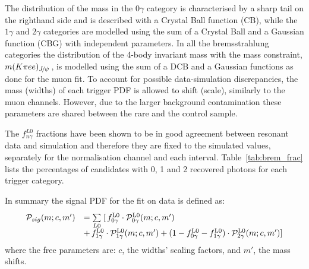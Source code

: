 The distribution of the \mKpiee mass in the $0\gamma$ category is characterised by a sharp tail on the righthand side and is described 
with a Crystal Ball function (CB), while the $1\gamma$ and $2\gamma$ categories are modelled using the sum of a Crystal Ball 
and a Gaussian function (CBG) with independent parameters. In all the bremsstrahlung categories the distribution of the 4-body 
invariant mass with the \jpsi mass constraint, $m(K\pi ee)_{\jpsi}$, is modelled using the sum of a DCB and a Gaussian 
functions as done for the muon fit.
%
To account for possible data-simulation discrepancies, the mass (widths) of each trigger PDF is allowed to shift (scale), similarly to the muon channels.
However, due to the larger background contamination these parameters are shared between the rare and the \BdToKstJPsee control sample.


The $f^{L0}_{n\gamma}$ fractions have been shown to be in good agreement between 
resonant data and simulation and therefore they are fixed to the simulated values, separately
for the normalisation channel and each \qsq interval. Table~\ref{tab:brem_frac} lists the percentages
of candidates with 0, 1 and 2 recovered photons for each trigger category.

In summary the signal PDF for the fit on data is defined as:
%
\begin{equation}
\begin{array} {ll}
\mathcal{P}_{sig}(m;c,m') & = \sum\limits_{L0}^{} \;[ \, f^{\rm L0}_{0\gamma} \cdot \mathcal{P}^{\rm L0}_{0\gamma}(m;c,m')  \\
& + \, f^{\rm L0}_{1\gamma} \cdot \mathcal{P}^{\rm L0}_{1\gamma}(m;c,m') + (1 - f^{\rm L0}_{0\gamma} - f^{\rm L0}_{1\gamma}) \cdot \mathcal{P}^{\rm L0}_{2\gamma}(m;c,m')]
\end{array} 
\end{equation}
%
where the free parameters are: $c$, the widths' scaling factors, and $m'$, the mass shifts.


